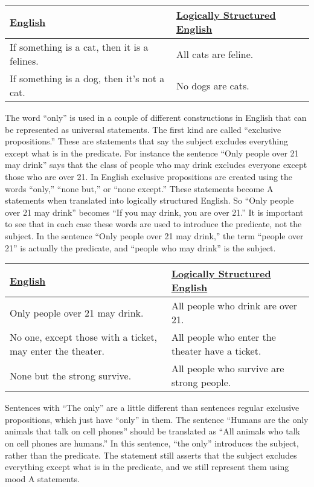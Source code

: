 \begin{table*}
\begin{longtabu}{p{.5\linewidth}p{.5\linewidth}}
\underline{English} & \underline{Logically Structured English} \\
\endhead
If something is a cat, then it is a felines. & All cats are feline.\\
If something is a dog, then it's not a cat. & No dogs are cats. \\
\end{longtabu}
\end{table*}

The word ``only'' is used in a couple of different constructions in English that can be represented as universal statements. The first kind are called ``exclusive propositions.'' These are statements that say the subject excludes everything except what is in the predicate. For instance the sentence ``Only people over 21 may drink'' says that the class of people who may drink excludes everyone except those who are over 21. In English exclusive propositions are created using the words ``only,'' ``none but,'' or ``none except.'' These statements become A statements when translated into logically structured English. So ``Only people over 21 may drink'' becomes ``If you may drink, you  are over 21.'' It is important to see that in each case these words are used to introduce the predicate, not the subject. In the sentence ``Only people over 21 may drink,'' the term ``people over 21'' is actually the  predicate, and ``people who may drink'' is the subject.

\begin{table*}
\begin{longtabu}{p{.5\linewidth}p{.5\linewidth}}
\underline{English} & \underline{Logically Structured English} \\
\endhead
Only people over 21 may drink. & All people who drink are over 21.\\
No one, except those with a ticket, may enter the theater. & All people who enter the theater have a ticket. \\
None but the strong survive. & All people who survive are strong people. \\
\end{longtabu}
\end{table*}

Sentences with ``The only'' are a little different than sentences regular exclusive propositions, which just have ``only'' in them. The sentence ``Humans are the only animals that talk on cell phones'' should be translated as ``All animals who talk on cell phones are humans.'' In this sentence, ``the only'' introduces the subject, rather than the predicate. The statement still asserts that the subject excludes everything except what is in the predicate, and we still represent them using mood A statements.


